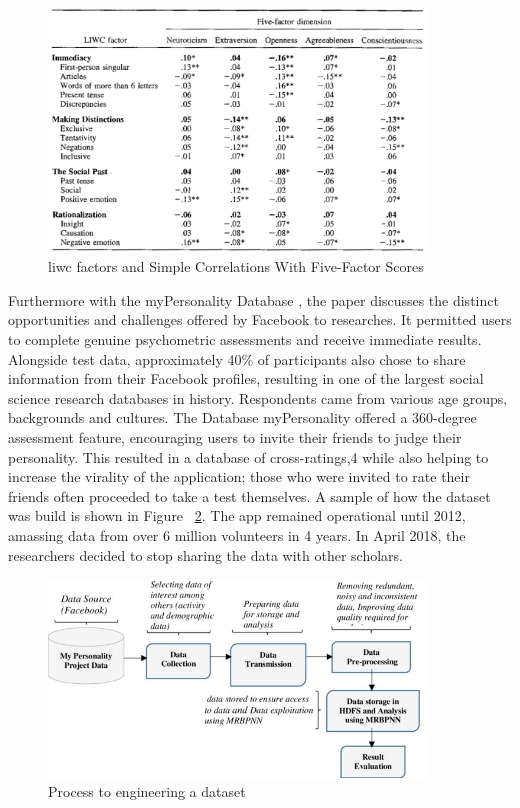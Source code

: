 \begin{figure}[H]
\centering
\includegraphics[width=10cm]{Table2}
\caption{\ac{liwc} factors and Simple Correlations With Five-Factor Scores\cite{pennebaker1999linguistic}}
\label{fig:LIWCfactors}
\end{figure}
Furthermore with the myPersonality Database \cite{kosinski2015facebook}, the paper discusses the distinct opportunities and challenges offered by Facebook to researches. It permitted users to complete genuine psychometric assessments and receive immediate results. Alongside test data, approximately 40\% of participants also chose to share information from their Facebook profiles, resulting in one of the largest social science research databases in history. Respondents came from various age groups, backgrounds and cultures. The Database myPersonality offered a 360-degree
assessment feature, encouraging users to invite their friends to judge their personality.  This resulted in a database of cross-ratings,4 while also helping to increase the virality of the application; those who were invited to rate their friends often proceeded to take a test themselves. A sample of how the dataset was build is shown in Figure ~\ref{fig: engineerDataset}. The app remained operational until 2012, amassing data from over 6 million volunteers in 4 years. In April 2018, the researchers decided to stop sharing the data with other scholars. 
\begin{figure}[H]
\centering
\includegraphics[width=10cm]{Figure3}
\caption{Process to engineering a dataset\cite{kosinski2015facebook}}
\label{fig: engineerDataset}
\end{figure}
